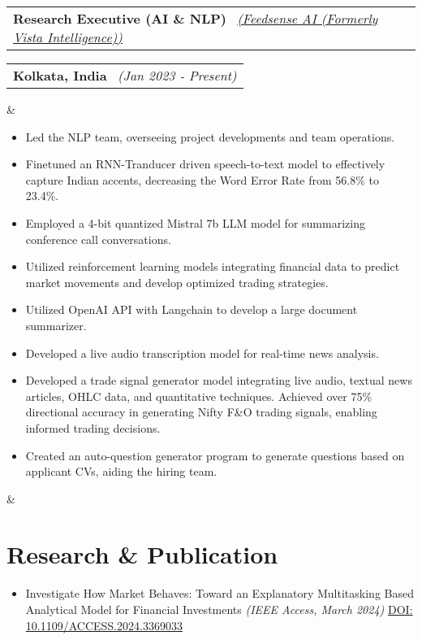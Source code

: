 \documentclass[11pt,a4paper,sans]{moderncv}
\makeatletter
\newcommand*{\customcventry}[7][.13em]{
\begin{tabular}{@{}l}
{\bfseries #4} \
{\itshape #3}
\end{tabular}
\hfill
\begin{tabular}{l@{}}
{\bfseries #5} \
{\itshape #2}
\end{tabular}
\ifx&#7&%
\else{\
\begin{minipage}{\maincolumnwidth}%
\small#7%
\end{minipage}}\fi%
\par\addvspace{#1}}
\makeatother
\begin{document}
\customcventry{(Jan 2023 ‐ Present)}{{\color{blue}\href{https://feedsense.vistaintelligence.ai/}{(Feedsense AI (Formerly Vista Intelligence))}}}{Research Executive (AI \& NLP) }{Kolkata, 
India}{}{
{\begin{itemize}[leftmargin=0.6cm, label={\textbullet}]
\item Led the NLP team, overseeing project developments and team operations.
\item Finetuned an RNN-Tranducer driven speech-to-text model to effectively capture Indian accents, decreasing the Word Error Rate from 56.8\% to 23.4\%.
\item Employed a 4-bit quantized Mistral 7b LLM model for summarizing conference call conversations.
\item Utilized reinforcement learning models integrating financial data to predict market movements and develop optimized trading strategies.
\item Utilized OpenAI API with Langchain to develop a large document summarizer.
\item Developed a live audio transcription model for real-time news analysis.
\item Developed a trade signal generator model integrating live audio, textual news articles, OHLC data, and quantitative techniques. Achieved over 75\% directional accuracy in generating Nifty F\&O trading signals, enabling informed trading decisions.
\item Created an auto-question generator program to generate questions based on applicant CVs, aiding the hiring team.
\end{itemize}}}


\section{Research \& Publication}
{\begin{itemize}[label=\textbullet]
    \item Investigate How Market Behaves: Toward an Explanatory Multitasking Based Analytical Model for Financial Investments \textit{(IEEE Access, March 2024)} \color{blue}\href{DOI: 10.1109/ACCESS.2024.3369033}{DOI: 10.1109/ACCESS.2024.3369033}
\end{itemize}}
\end{document}
